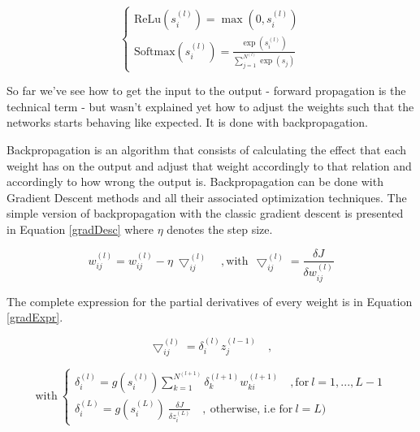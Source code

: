 \begin{equation} \label{eq:actFuncs}
    \begin{cases}
        \text{ReLu}\left(s_{i}^{(l)}\right) = \max\left(0,s_{i}^{(l)}\right) \\
        \text{Softmax}\left(s_{i}^{(l)}\right) = \frac{\exp\left(s_i^{(l)}\right)}{\sum_{j=1}^{N^{(l)}} \exp(s_j)} 
    \end{cases}
\end{equation}

So far we've see how to get the input to the output - forward propagation is the technical term - but wasn't explained yet how to adjust the weights such that the networks starts behaving like expected. It is done with backpropagation.

Backpropagation is an algorithm that consists of calculating the effect that each weight has on the output and adjust that weight accordingly to that relation and accordingly to how wrong the output is. Backpropagation can be done with Gradient Descent methods and all their associated optimization techniques. The simple version of backpropagation with the classic gradient descent is presented in Equation \eqref{gradDesc} where $\eta$ denotes the step size.

\begin{equation} \label{gradDesc}
    w_{ij}^{(l)} = w_{ij}^{(l)} - \eta \ \bigtriangledown_{ij}^{(l)} \quad , \text{with} \ \ \bigtriangledown_{ij}^{(l)} = \frac{\delta J}{\delta w_{ij}^{(l)}}
\end{equation}

The complete expression for the partial derivatives of every weight is in Equation \eqref{gradExpr}.

\begin{equation} \label{gradExpr}
    \bigtriangledown_{ij}^{(l)} = \delta_i^{(l)} z_j^{(l-1)} \quad,  
\end{equation}

\begin{equation}
    \text{with} \ 
    \begin{cases}
    \delta_i^{(l)} = g\left(s_i^{(l)}\right) 
    \sum_{k=1}^{N^{(l+1)}} \delta_k^{(l+1)} w_{ki}^{(l+1)} \quad, \text{for} \ l = 1, ..., L-1\\ 
    
    \delta_i^{(L)} = g\left(s_i^{(L)}\right) \ \frac{\delta J}{\delta z_i^{(L)}}
    \quad, \ \text{otherwise, i.e for} \ l = L)
    \end{cases}
\end{equation}




